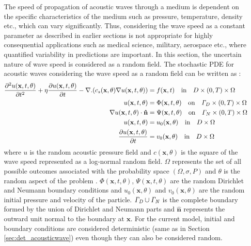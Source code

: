 \documentclass{article}
\begin{document}
The speed of propagation of acoustic waves through a medium is dependent on the specific characteristics of the medium such as pressure, temperature, density etc., which can vary significantly. Thus, considering the wave speed as a constant parameter as described in earlier sections is not appropriate for highly consequential applications such as medical science, military, aerospace etc., where quantified variability in predictions are important. In this section, the uncertain nature of wave speed is considered as a random field. The stochastic PDE for acoustic waves considering the wave speed as a random field can be written as \cite{motamed2013stochastic}:
\begin{align}\label{Eq.acous_sto}
\frac{\partial^2 u(\mathbf{x},t,\theta)}{\partial t^2} + \eta \frac{\partial u(\mathbf{x},t,\theta)}{\partial t} - \nabla . ( c_s(\mathbf{x},\theta)  \nabla u (\mathbf{x}, t, \theta)) &= f (\mathbf{x}, t) \quad  \textrm{in} \quad D \times (0,T) \times \Omega \\
u(\mathbf{x},t, \theta) &= \Phi(\mathbf{x},t,\theta) \quad  \textrm{on} \quad  {\it{\Gamma}}_D \times (0,T) \times \Omega \\
\nabla u(\mathbf{x},t,\theta) \cdot \mathbf{\hat{n}}  &= \Psi(\mathbf{x},t,\theta) \quad  \textrm{on} \quad {\it{\Gamma}}_N \times (0,T) \times \Omega \\
u(\mathbf{x},t, \theta) &= u_0(\mathbf{x}, \theta)\quad   \textrm{in} \quad  D \times \Omega\\
\frac{\partial u(\mathbf{x},t, \theta)}{\partial t} &= v_0(\mathbf{x},\theta) \quad  \textrm{in} \quad  D \times \Omega 
\end{align}
where $u$ is the random acoustic pressure field and $c(\mathbf{x}, \theta)$ is the square of the wave speed represented as a log-normal random field. $\Omega$ represents the set of all possible outcomes associated with the probability space $(\Omega, \sigma, P)$ and $\theta$ is the random aspect of the problem \cite{xiu_wave,wave_UQ}. $\Phi(\mathbf{x},t,\theta)$, $\Psi(\mathbf{x},t,\theta)$ are the random Dirichlet and Neumann boundary conditions and $u_0(\mathbf{x},\theta)$ and $v_0(\mathbf{x},\theta)$ are the random initial pressure and velocity of the particle. $\it{\Gamma}_D \cup \it{\Gamma}_N $ is the complete boundary formed by the union of Dirichlet and Neumann parts and $\mathbf{\hat{n}}$ represents the outward unit normal to the boundary at $\mathbf{x}$. For the current model, initial and boundary conditions are considered deterministic (same as in Section \ref{sec:det_acousticwave}) even though they can also be considered random.
\end{document}
